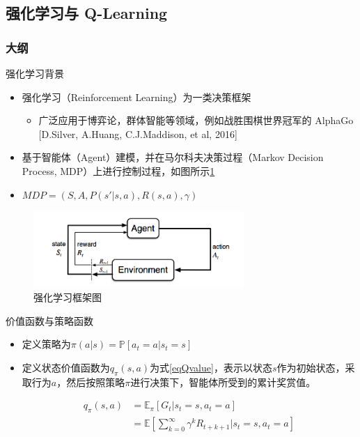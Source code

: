 \documentclass{beamer}
\begin{document}
\subsection{强化学习与 Q-Learning}
\begin{frame}
\frametitle{大纲} %
\tableofcontents
    [
        currentsection,
        currentsubsection,
        subsectionstyle=show/shaded/hide
    ]
\end{frame}
\begin{frame}{强化学习背景}
    \begin{itemize}
        \item 强化学习（Reinforcement Learning）为一类决策框架
        \begin{itemize}
            \item 广泛应用于博弈论，群体智能等领域，例如战胜围棋世界冠军的 AlphaGo [D.Silver, A.Huang, C.J.Maddison, et al, 2016]
        \end{itemize}
        \item 基于智能体（Agent）建模，并在马尔科夫决策过程（Markov Decision Process, MDP）上进行控制过程，如图所示\ref{fig:RL}
        \item $MDP=(S, A, P(s'| s, a), R(s,a), \gamma)$
    \end{itemize}
    \begin{figure}
    \centering
    \includegraphics[width=8.0cm]{pic/4-1.png}
    \caption{强化学习框架图}
    \label{fig:RL}
\end{figure}
\end{frame}


\begin{frame}{价值函数与策略函数}
\begin{itemize}
    \item 定义策略为$\pi(a|s) = \mathbb{P}[a_t=a | s_t=s]$
    \item 定义状态价值函数为$q_{\pi}(s,a)$为式\ref{eqQvalue}，表示以状态$s$作为初始状态，采取行为$a$，然后按照策略$\pi$进行决策下，智能体所受到的累计奖赏值。

        \begin{equation}
            \label{eqQvalue}
            \begin{aligned}
             q_{\pi}(s,a)   & =\mathbb{E}_{\pi}[G_t|s_t=s, a_t=a] \\          
                            & =\mathbb{E}[\sum_{k=0}^{\infty}{\gamma^k{R_{t+k+1}}}|s_t=s, a_t=a]
            \end{aligned}
    \end{equation}
\end{itemize}

\end{frame}
\end{document}
